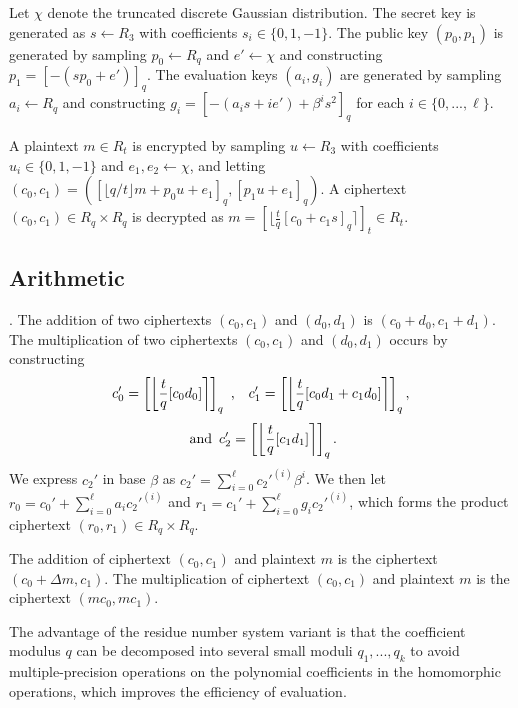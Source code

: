 \documentclass[conference]{IEEEtran}
\begin{document}
Let $\chi$ denote the truncated discrete Gaussian distribution.
The secret key is generated as $s \leftarrow R_3$ with coefficients $s_i \in \{ 0, 1, -1\}$.
The public key $(p_0, p_1)$ is generated by sampling $p_0 \leftarrow R_q$ and $e' \leftarrow \chi$ and constructing $p_1 = [−(s p_0 + e')]_q$.
The evaluation keys $(a_i, g_i)$ are generated by sampling $a_i \leftarrow R_q$ and constructing $g_i=[−(a_i s + ie') + \beta^i s^2]_q$ for each $i \in \{0, ..., \ell\}$.

A plaintext $m \in R_t$ is encrypted by sampling $u \leftarrow R_3$ with coefficients $u_i \in \{ 0, 1, -1\}$ and $e_1,e_2 \leftarrow \chi$, and letting $(c_0,c_1)=([\lfloor {q/t} \rfloor m+p_0u+e_1]_q,[p_1u+e_1]_q)$.
A ciphertext $(c_0,c_1) \in R_q \times R_q$ is decrypted as $m=[\lfloor \frac{t}{q} [c_0+c_1s]_q \rceil]_t \in R_t$.

\subsection{Arithmetic}.
The addition of two ciphertexts $(c_0,c_1)$ and $(d_0,d_1)$ is $(c_0+d_0,c_1+d_1)$.
The multiplication of two ciphertexts $(c_0,c_1)$ and $(d_0,d_1)$ occurs by constructing
\begin{equation*}
    c_0' = \left[\left\lfloor \frac{t}{q} [c_0 d_0] \right\rceil\right]_q \textrm{ ,\quad } c_1' = \left[\left\lfloor \frac{t}{q} [c_0 d_1 + c_1 d_0] \right\rceil\right]_q,
\end{equation*}
\begin{equation*}
   \textrm{ and \,} c_2' = \left[\left\lfloor \frac{t}{q} [c_1 d_1] \right\rceil\right]_q .
\end{equation*}
We express $c_2'$ in base $\beta$ as $c_2' = \sum_{i=0}^{\ell} c_2'^{(i)} \beta^i$. We then let $r_0=c_0'+\sum_{i=0}^{\ell} a_i c_2'^{(i)}$ and $r_1= c_1'+\sum_{i=0}^{\ell} g_i c_2'^{(i)}$, which forms the product ciphertext $(r_0, r_1) \in R_q \times R_q$.

The addition of ciphertext $(c_0,c_1)$ and plaintext $m$ is the ciphertext $(c_0+\Delta m,c_1)$. The multiplication of ciphertext $(c_0,c_1)$ and plaintext $m$ is the ciphertext $(mc_0,mc_1)$.

The advantage of the residue number system variant is that the coefficient modulus $q$ can be decomposed into several small moduli $q_1, ..., q_k$ to avoid multiple-precision operations on the polynomial coefficients in the homomorphic operations, which improves the efficiency of evaluation.
\end{document}

